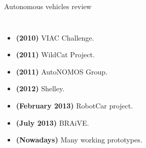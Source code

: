   \begin{frame}{Autonomous vehicles review}
    \begin{columns}[T] %
      \footnotesize
      \begin{itemize}
	\item<1-> \textbf{(2010)} VIAC Challenge.
	\item<3-> \textbf{(2011)} WildCat Project.
	\item<4-> \textbf{(2011)} AutoNOMOS Group.
	\item<5-> \textbf{(2012)} Shelley.
	\item<6-> \textbf{(February 2013)} RobotCar project.
	\item<7-> \textbf{(July 2013)} BRAiVE.
	\item<8-> \textbf{(Nowadays)} Many working prototypes.
      \end{itemize}  
      \begin{center}
	\vskip -1cm
       	\begin{overlayarea}{\textwidth}{\textheight}
\end{overlayarea}
\end{center}
\end{columns}
\end{frame}

